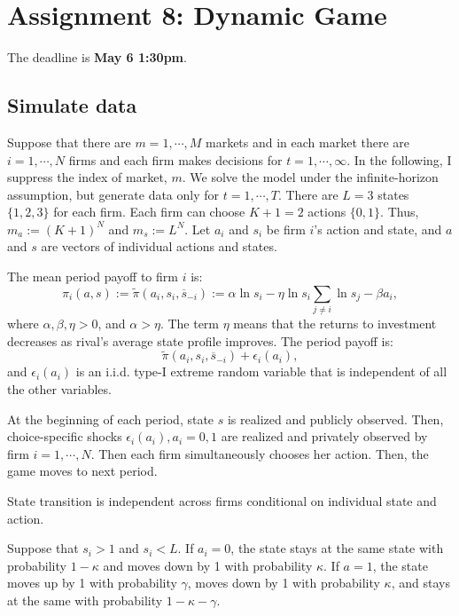 \documentclass[]{book}
\begin{document}
\chapter{Assignment 8: Dynamic Game}\label{assignment8}

The deadline is \textbf{May 6 1:30pm}.

\section{Simulate data}\label{simulate-data-7}

Suppose that there are \(m = 1, \cdots, M\) markets and in each market
there are \(i = 1, \cdots, N\) firms and each firm makes decisions for
\(t = 1, \cdots, \infty\). In the following, I suppress the index of
market, \(m\). We solve the model under the infinite-horizon assumption,
but generate data only for \(t = 1, \cdots, T\). There are \(L = 3\)
states \(\{1, 2, 3\}\) for each firm. Each firm can choose \(K + 1 = 2\)
actions \(\{0, 1\}\). Thus, \(m_a := (K + 1)^N\) and \(m_s := L^N\). Let
\(a_i\) and \(s_i\) be firm \(i\)'s action and state, and \(a\) and
\(s\) are vectors of individual actions and states.

The mean period payoff to firm \(i\) is: \[
\pi_i(a, s) := \tilde{\pi}(a_i, s_i, \overline{s}_{-i}) :=  \alpha \ln s_i - \eta \ln s_i \sum_{j \neq i} \ln s_j - \beta a_i,
\] where \(\alpha, \beta, \eta> 0\), and \(\alpha > \eta\). The term
\(\eta\) means that the returns to investment decreases as rival's
average state profile improves. The period payoff is: \[
\tilde{\pi}(a_i, s_i, \overline{s}_{-i})+ \epsilon_i(a_i),
\] and \(\epsilon_i(a_i)\) is an i.i.d. type-I extreme random variable
that is independent of all the other variables.

At the beginning of each period, state \(s\) is realized and publicly
observed. Then, choice-specific shocks \(\epsilon_i(a_i), a_i = 0, 1\)
are realized and privately observed by firm \(i = 1, \cdots, N\). Then
each firm simultaneously chooses her action. Then, the game moves to
next period.

State transition is independent across firms conditional on individual
state and action.

Suppose that \(s_i > 1\) and \(s_i < L\). If \(a_i = 0\), the state
stays at the same state with probability \(1 - \kappa\) and moves down
by 1 with probability \(\kappa\). If \(a = 1\), the state moves up by 1
with probability \(\gamma\), moves down by 1 with probability
\(\kappa\), and stays at the same with probability
\(1 - \kappa - \gamma\).
\end{document}
